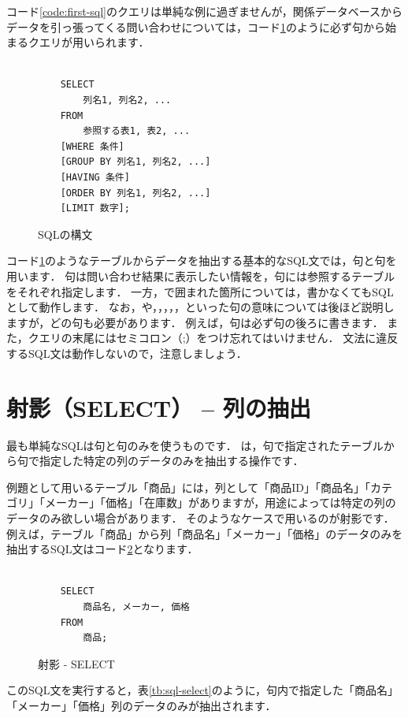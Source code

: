 コード\ref{code:first-sql}のクエリは単純な例に過ぎませんが，関係データベースからデータを引っ張ってくる問い合わせについては，コード\ref{code:sql-structure}のように必ず句から始まるクエリが用いられます．
\begin{figure}[!htbp]
    \begin{verbatim}

    SELECT
        列名1, 列名2, ...
    FROM
        参照する表1, 表2, ...
    [WHERE 条件]
    [GROUP BY 列名1, 列名2, ...]
    [HAVING 条件]
    [ORDER BY 列名1, 列名2, ...]
    [LIMIT 数字];

    \end{verbatim}
    \captionsetup{name=コード}
    \caption{SQLの構文}
    \label{code:sql-structure}
\end{figure}
コード\ref{code:sql-structure}のようなテーブルからデータを抽出する基本的なSQL文では，句と句を用います．
句は問い合わせ結果に表示したい情報を，句には参照するテーブルをそれぞれ指定します．
一方，\graybox{[ ]}で囲まれた箇所については，書かなくてもSQLとして動作します．
なお，や，，，，，といった句の意味については後ほど説明しますが，どの句も必要があります．
例えば，句は必ず句の後ろに書きます．
また，クエリの末尾にはセミコロン（;）をつけ忘れてはいけません．
文法に違反するSQL文は動作しないので，注意しましょう．


\section{射影（SELECT） -- 列の抽出}
最も単純なSQLは句と句のみを使うものです．
は，句で指定されたテーブルから句で指定した特定の列のデータのみを抽出する操作です．

例題として用いるテーブル「商品」には，列として「商品ID」「商品名」「カテゴリ」「メーカー」「価格」「在庫数」がありますが，用途によっては特定の列のデータのみ欲しい場合があります．
そのようなケースで用いるのが射影です．
例えば，テーブル「商品」から列「商品名」「メーカー」「価格」のデータのみを抽出するSQL文はコード\ref{code:sql-select}となります．
\begin{figure}[!htbp]
    \begin{verbatim}

    SELECT
        商品名, メーカー, 価格
    FROM
        商品;

    \end{verbatim}
    \captionsetup{name=コード}
    \caption{射影 - SELECT}
    \label{code:sql-select}
\end{figure}
このSQL文を実行すると，表\ref{tb:sql-select}のように，句内で指定した「商品名」「メーカー」「価格」列のデータのみが抽出されます．

